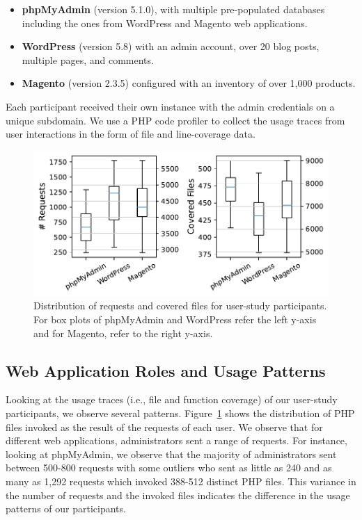 \begin{itemize}
    \item \textbf{phpMyAdmin} (version 5.1.0), with multiple pre-populated databases including the ones from WordPress and Magento web applications.
    \item \textbf{WordPress} (version 5.8) with an admin account, over 20 blog posts, multiple pages, and comments. 
    \item \textbf{Magento} (version 2.3.5) configured with an inventory of over 1,000 products. 
\end{itemize}

Each participant received their own instance with the admin credentials on a unique subdomain. 
We use a PHP code profiler to collect the usage traces from user interactions in the form of file and line-coverage data. 

\begin{figure}[t]
    \centering
    \includegraphics[width=0.8\linewidth]{figures/dbltr/userstudy_boxplots.pdf}
    \caption{Distribution of requests and covered files for user-study participants. For box plots of phpMyAdmin and WordPress refer the left y-axis and for Magento, refer to the right y-axis.}
	\label{fig:userstudystats}
\end{figure}

\subsection{Web Application Roles and Usage Patterns}

Looking at the usage traces (i.e., file and function coverage) of our user-study participants, we observe several patterns. 
Figure~\ref{fig:userstudystats} shows the distribution of PHP files invoked as the result of the requests of each user. 
We observe that for different web applications, administrators sent a range of requests. 
For instance, looking at phpMyAdmin, we observe that the majority of administrators sent between 500-800 requests with some outliers who sent as little as 240 and as many as 1,292 requests which invoked 388-512 distinct PHP files. 
This variance in the number of requests and the invoked files indicates the difference in the usage patterns of our participants. 

